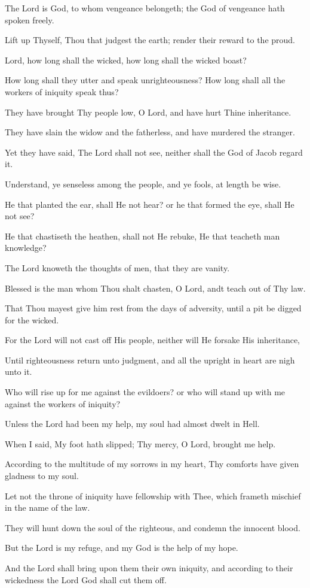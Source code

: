 The Lord is God, to whom vengeance belongeth; the God of vengeance hath spoken freely.

Lift up Thyself, Thou that judgest the earth; render their reward to the proud.

Lord, how long shall the wicked, how long shall the wicked boast?

How long shall they utter and speak unrighteousness? How long shall all the workers of iniquity speak thus?

They have brought Thy people low, O Lord, and have hurt Thine inheritance.

They have slain the widow and the fatherless, and have murdered the stranger.

Yet they have said, The Lord shall not see, neither shall the God of Jacob regard it.

Understand, ye senseless among the people, and ye fools, at length be wise.

He that planted the ear, shall He not hear? or he that formed the eye, shall He not see?

He that chastiseth the heathen, shall not He rebuke, He that teacheth man knowledge?

The Lord knoweth the thoughts of men, that they are vanity.

Blessed is the man whom Thou shalt chasten, O Lord, andt teach out of Thy law.

That Thou mayest give him rest from the days of adversity, until a pit be digged for the wicked.

For the Lord will not cast off His people, neither will He forsake His inheritance,

Until righteousness return unto judgment, and all the upright in heart are nigh unto it.

Who will rise up for me against the evildoers? or who will stand up with me against the workers of iniquity?

Unless the Lord had been my help, my soul had almost dwelt in Hell.

When I said, My foot hath slipped; Thy mercy, O Lord, brought me help.

According to the multitude of my sorrows in my heart, Thy comforts have given gladness to my soul.

Let not the throne of iniquity have fellowship with Thee, which frameth mischief in the name of the law.

They will hunt down the soul of the righteous, and condemn the innocent blood.

But the Lord is my refuge, and my God is the help of my hope.

And the Lord shall bring upon them their own iniquity, and according to their wickedness the Lord God shall cut them off.
